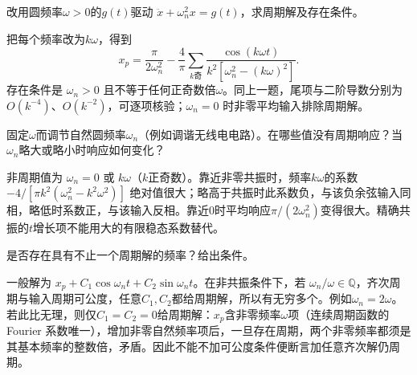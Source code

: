 \begin{exercise}\label{cw:rec15-3}
改用圆频率$\omega>0$的$g(t)$驱动 $\ddot x+\omega_n^2x=g(t)$，求周期解及存在条件。
\end{exercise}
\begin{solution}
把每个频率改为$k\omega$，得到
\[x_p=\frac\pi{2\omega_n^2}-\frac4\pi\sum_{k\text{奇}}\frac{\cos(k\omega t)}{k^2[\omega_n^2-(k\omega)^2]}.
\]
存在条件是 $\omega_n>0$ 且不等于任何正奇数倍$\omega$。同上一题，尾项与二阶导数分别为$O(k^{-4})$、$O(k^{-2})$，可逐项核验；$\omega_n=0$ 时非零平均输入排除周期解。
\par{}
\end{solution}

\begin{exercise}\label{cw:rec15-4}
固定$\omega$而调节自然圆频率$\omega_n$（例如调谐无线电电路）。在哪些值没有周期响应？当$\omega_n$略大或略小时响应如何变化？
\end{exercise}
\begin{solution}
非周期值为 $\omega_n=0$ 或 $k\omega$（$k$正奇数）。靠近非零共振时，频率$k\omega$的系数 $-4/[\pi k^2(\omega_n^2-k^2\omega^2)]$ 绝对值很大；略高于共振时此系数负，与该负余弦输入同相，略低时系数正，与该输入反相。靠近0时平均响应$\pi/(2\omega_n^2)$变得很大。精确共振的$t$增长项不能用大的有限稳态系数替代。
\par{}
\end{solution}

\begin{exercise}\label{cw:rec15-5}
是否存在具有不止一个周期解的频率？给出条件。
\end{exercise}
\begin{solution}
一般解为 $x_p+C_1\cos\omega_nt+C_2\sin\omega_nt$。在非共振条件下，若 $\omega_n/\omega\in\mathbb Q$，齐次周期与输入周期可公度，任意$C_1,C_2$都给周期解，所以有无穷多个。例如$\omega_n=2\omega$。
若此比无理，则仅$C_1=C_2=0$给周期解：$x_p$含非零频率$\omega$项（连续周期函数的 Fourier 系数唯一），增加非零自然频率项后，一旦存在周期，两个非零频率都须是其基本频率的整数倍，矛盾。因此不能不加可公度条件便断言加任意齐次解仍周期。
\par{}
\end{solution}


